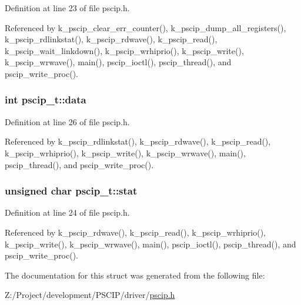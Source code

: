 Definition at line 23 of file pscip.h.

Referenced by k\_\-pscip\_\-clear\_\-err\_\-counter(), k\_\-pscip\_\-dump\_\-all\_\-registers(), k\_\-pscip\_\-rdlinkstat(), k\_\-pscip\_\-rdwave(), k\_\-pscip\_\-read(), k\_\-pscip\_\-wait\_\-linkdown(), k\_\-pscip\_\-wrhiprio(), k\_\-pscip\_\-write(), k\_\-pscip\_\-wrwave(), main(), pscip\_\-ioctl(), pscip\_\-thread(), and pscip\_\-write\_\-proc().\hypertarget{structpscip__t_d6ee430a30c9dc8e5ad006efcf5be07d}{
\subsubsection[{data}]{\setlength{\rightskip}{0pt plus 5cm}int {\bf pscip\_\-t::data}}}
\label{structpscip__t_d6ee430a30c9dc8e5ad006efcf5be07d}




Definition at line 26 of file pscip.h.

Referenced by k\_\-pscip\_\-rdlinkstat(), k\_\-pscip\_\-rdwave(), k\_\-pscip\_\-read(), k\_\-pscip\_\-wrhiprio(), k\_\-pscip\_\-write(), k\_\-pscip\_\-wrwave(), main(), pscip\_\-thread(), and pscip\_\-write\_\-proc().\hypertarget{structpscip__t_79235a96d6d6c52c0bb0dcc922947547}{
\subsubsection[{stat}]{\setlength{\rightskip}{0pt plus 5cm}unsigned char {\bf pscip\_\-t::stat}}}
\label{structpscip__t_79235a96d6d6c52c0bb0dcc922947547}




Definition at line 24 of file pscip.h.

Referenced by k\_\-pscip\_\-rdwave(), k\_\-pscip\_\-read(), k\_\-pscip\_\-wrhiprio(), k\_\-pscip\_\-write(), k\_\-pscip\_\-wrwave(), main(), pscip\_\-ioctl(), pscip\_\-thread(), and pscip\_\-write\_\-proc().

The documentation for this struct was generated from the following file:\begin{CompactItemize}
\item 
Z:/Project/development/PSCIP/driver/\hyperlink{pscip_8h}{pscip.h}\end{CompactItemize}
